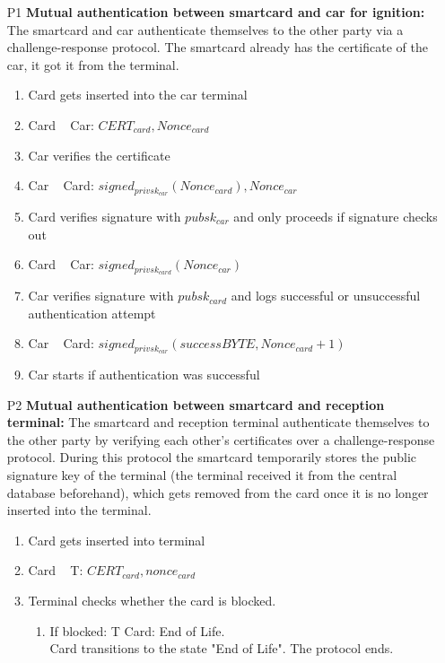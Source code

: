 \documentclass[a4paper]{article}
\begin{document}
\begin{itemize}
    \item[P1] \textbf{Mutual authentication between smartcard and car for ignition:} The smartcard and car authenticate themselves to the other party via a challenge-response protocol. The smartcard already has the certificate of the car, it got it from the terminal.
    \begin{enumerate}
        \item Card gets inserted into the car terminal
        \item Card \textrightarrow~ Car:  $CERT_{card}, Nonce_{card}$
        \item Car verifies the certificate
        \item Car \textrightarrow~ Card: $signed_{privsk_{car}}(Nonce_{card}), Nonce_{car}$
        \item Card verifies signature with $pubsk_{car}$ and only proceeds if signature checks out 
        \item Card \textrightarrow~ Car: $signed_{privsk_{card}}(Nonce_{car})$
        \item Car verifies signature with $pubsk_{card}$ and logs successful or unsuccessful authentication attempt
        \item Car \textrightarrow~ Card: $signed_{privsk_{car}}(successBYTE, Nonce_{card}+1)$
        \item Car starts if authentication was successful
    \end{enumerate}
    \item[P2] \textbf{Mutual authentication between smartcard and reception terminal:} The smartcard and reception terminal authenticate themselves to the other party by verifying each other's certificates over a challenge-response protocol. During this protocol the smartcard temporarily stores the public signature key of the terminal (the terminal received it from the central database beforehand), which gets removed from the card once it is no longer inserted into the terminal.
    \begin{enumerate}
        \item Card gets inserted into terminal
        \item Card \textrightarrow~ T: $CERT_{card}, nonce_{card}$
        \item Terminal checks whether the card is blocked. \begin{enumerate}
            \item If blocked: T \textrightarrow Card: End of Life.\\ Card transitions to the state "End of Life". The protocol ends.

\end{enumerate}
\end{enumerate}
\end{itemize}
\end{document}

